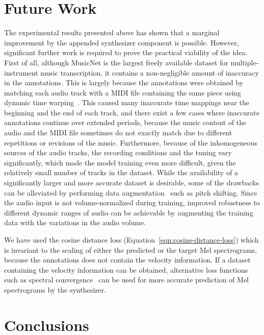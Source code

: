 \section{Future Work}

The experimental results presented above has shown that a marginal improvement by the appended synthesizer component is possible. However, significant further work is required to prove the practical viability of the idea.
First of all, although MusicNet is the largest freely available dataset for multiple-instrument music transcription, it contains a non-negligible amount of inaccuracy in the annotations.
This is largely because the annotations were obtained by matching each audio track with a MIDI file containing the same piece using dynamic time warping~\cite{thickstun2017musicnet}.
This caused many inaccurate time mappings near the beginning and the end of each track, and there exist a few cases where inaccurate annotations continue over extended periods, because the music content of the audio and the MIDI file sometimes do not exactly match due to different repetitions or revisions of the music.
Furthermore, because of the inhomogeneous sources of the audio tracks, the recording conditions and the tuning vary significantly, which made the model training even more difficult, given the relatively small number of tracks in the dataset.
While the availability of a significantly larger and more accurate dataset is desirable, some of the drawbacks can be alleviated by performing data augmentation~\cite{mcfee2015muda} such as pitch shifting.
Since the audio input is not volume-normalized during training, improved robustness to different dynamic ranges of audio can be achievable by augmenting the training data with the variations in the audio volume.

We have used the cosine distance loss (Equation~\ref{eqn:cosine-distance-loss}) which is invariant to the scaling of either the predicted or the target Mel spectrograms, because the annotations does not contain the velocity information.
If a dataset containing the velocity information can be obtained, alternative loss functions such as spectral convergence~\cite{sturm2013classification} can be used for more accurate prediction of Mel spectrograms by the synthesizer.


\section{Conclusions}

